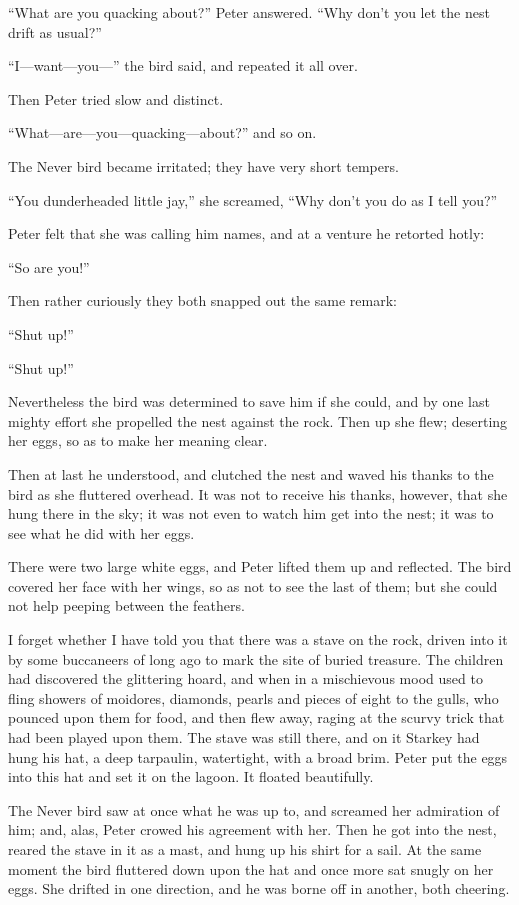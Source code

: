 “What are you quacking about?\@” Peter answered.
“Why don’t you let the nest drift as usual?”

“I—want—you—” the bird said, and repeated it all over.

Then Peter tried slow and distinct.

“What—are—you—quacking—about?\@” and so on.

The Never bird became irritated;
they have very short tempers.

“You dunderheaded little jay,” she screamed,
“Why don’t you do as I tell you?”

Peter felt that she was calling him names, and at a venture he retorted hotly:

“So are you!”

Then rather curiously they both snapped out the same remark:

“Shut up!”

“Shut up!”

Nevertheless the bird was determined to save him if she could,
and by one last mighty effort she propelled the nest against the rock.
Then up she flew;
deserting her eggs, so as to make her meaning clear.

Then at last he understood, and clutched the nest and waved his thanks to the bird as she fluttered overhead.
It was not to receive his thanks, however, that she hung there in the sky;
it was not even to watch him get into the nest;
it was to see what he did with her eggs.

There were two large white eggs, and Peter lifted them up and reflected.
The bird covered her face with her wings, so as not to see the last of them;
but she could not help peeping between the feathers.

I forget whether I have told you that there was a stave on the rock,
driven into it by some buccaneers of long ago to mark the site of buried treasure.
The children had discovered the glittering hoard,
and when in a mischievous mood used to fling showers of moidores, diamonds, pearls and pieces of eight to the gulls,
who pounced upon them for food, and then flew away, raging at the scurvy trick that had been played upon them.
The stave was still there,
and on it Starkey had hung his hat, a deep tarpaulin, watertight, with a broad brim.
Peter put the eggs into this hat and set it on the lagoon.
It floated beautifully.

The Never bird saw at once what he was up to, and screamed her admiration of him;
and, alas, Peter crowed his agreement with her.
Then he got into the nest, reared the stave in it as a mast, and hung up his shirt for a sail.
At the same moment the bird fluttered down upon the hat and once more sat snugly on her eggs.
She drifted in one direction, and he was borne off in another, both cheering.

